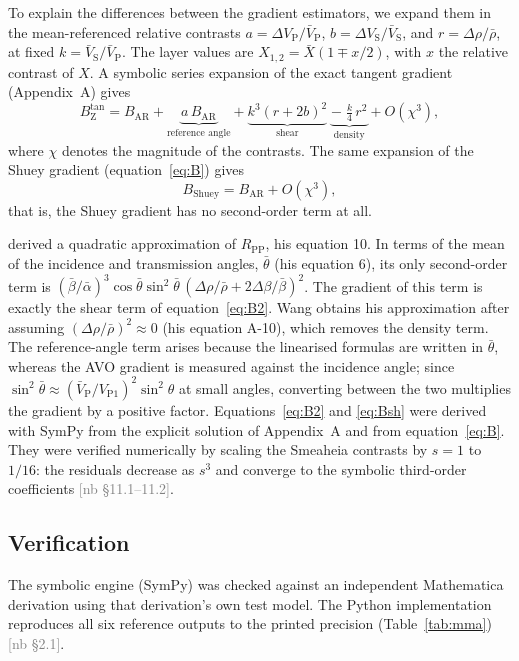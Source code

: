 \documentclass[11pt]{article}
\newcommand{\VP}{V_\mathrm{P}}
\newcommand{\VS}{V_\mathrm{S}}
\newcommand{\RPP}{R_\mathrm{PP}}
\newcommand{\Btan}{B_\mathrm{Z}^{\tan}}
\newcommand{\BAR}{B_\mathrm{AR}}
\newif\ifshownb \shownbtrue
\newcommand{\nb}[1]{\ifshownb\textcolor{gray}{[nb #1]}\fi}
\begin{document}
To explain the differences between the gradient estimators, we expand them in the mean-referenced relative contrasts $a=\Delta\VP/\bar V_\mathrm{P}$, $b=\Delta\VS/\bar V_\mathrm{S}$, and $r=\Delta\rho/\bar\rho$, at fixed $k=\bar V_\mathrm{S}/\bar V_\mathrm{P}$. The layer values are $X_{1,2}=\bar X(1\mp x/2)$, with $x$ the relative contrast of $X$. A symbolic series expansion of the exact tangent gradient (Appendix~A) gives
\begin{equation}
\Btan=\BAR+\underbrace{a\,\BAR}_{\text{reference angle}}+\underbrace{k^3(r+2b)^2}_{\text{shear}}\;\underbrace{-\;\tfrac{k}{4}\,r^2}_{\text{density}}+O(\chi^3),
\label{eq:B2}
\end{equation}
where $\chi$ denotes the magnitude of the contrasts. The same expansion of the Shuey gradient (equation~\ref{eq:B}) gives
\begin{equation}
B_\mathrm{Shuey}=\BAR+O(\chi^3),
\label{eq:Bsh}
\end{equation}
that is, the Shuey gradient has no second-order term at all.

\citet{wang1999} derived a quadratic approximation of $\RPP$, his equation 10. In terms of the mean of the incidence and transmission angles, $\bar\theta$ (his equation 6), its only second-order term is $(\bar\beta/\bar\alpha)^3\cos\bar\theta\sin^2\bar\theta\,(\Delta\rho/\bar\rho+2\Delta\beta/\bar\beta)^2$. The gradient of this term is exactly the shear term of equation~\ref{eq:B2}. Wang obtains his approximation after assuming $(\Delta\rho/\bar\rho)^2\approx0$ (his equation A-10), which removes the density term. The reference-angle term arises because the linearised formulas are written in $\bar\theta$, whereas the AVO gradient is measured against the incidence angle; since $\sin^2\bar\theta\approx(\bar V_\mathrm{P}/V_{\mathrm{P}1})^2\sin^2\theta$ at small angles, converting between the two multiplies the gradient by a positive factor. Equations~\ref{eq:B2} and \ref{eq:Bsh} were derived with SymPy from the explicit solution of Appendix~A and from equation~\ref{eq:B}. They were verified numerically by scaling the Smeaheia contrasts by $s=1$ to $1/16$: the residuals decrease as $s^3$ and converge to the symbolic third-order coefficients \nb{\S11.1--11.2}.

\subsection*{Verification}

The symbolic engine (SymPy) was checked against an independent Mathematica derivation using that derivation's own test model. The Python implementation reproduces all six reference outputs to the printed precision (Table~\ref{tab:mma}) \nb{\S2.1}.
\end{document}
